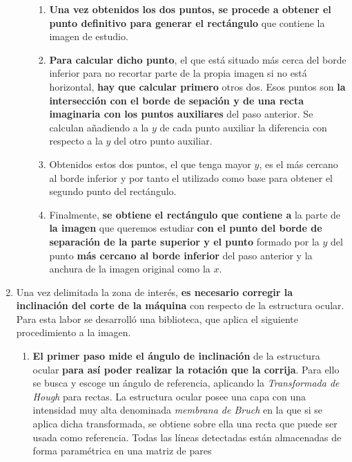 \begin{enumerate}
\begin{enumerate}[label*=\arabic*.]
\begin{enumerate}[label*=\arabic*.]
    \item \textbf{Una vez obtenidos los dos puntos, se procede a
        obtener el punto definitivo para generar el rectángulo} que
      contiene la imagen de estudio.
    \item \textbf{Para calcular dicho punto}, el que está situado más
      cerca del borde inferior para no recortar parte de la propia
      imagen si no está horizontal, \textbf{hay que calcular primero}
      otros dos. Esos puntos son \textbf{la intersección con el borde
        de sepación y de una recta imaginaria con los puntos
        auxiliares} del paso anterior. Se calculan añadiendo a la $y$
      de cada punto auxiliar la diferencia con respecto a la $y$ del
      otro punto auxiliar.
    \item Obtenidos estos dos puntos, el que tenga mayor $y$, es el
      más cercano al borde inferior y por tanto el utilizado como base
      para obtener el segundo punto del rectángulo.
    \item Finalmente, \textbf{se obtiene el rectángulo que contiene a}
      la parte de \textbf{la imagen} que queremos estudiar \textbf{con
        el punto del borde de separación de la parte superior y el
        punto} formado por la $y$ del punto \textbf{más cercano al
        borde inferior} del paso anterior y la anchura de la imagen
      original como la $x$.
    \end{enumerate}
  \end{enumerate}
\item Una vez delimitada la zona de interés, \textbf{es necesario
    corregir la inclinación del corte de la máquina} con respecto de
  la estructura ocular. \\
  Para esta labor se desarrolló una biblioteca, que aplica el
  siguiente procedimiento a la imagen.
  \begin{enumerate}[label*=\arabic*.]
  \item \textbf{El primer paso mide el ángulo de inclinación} de la
    estructura ocular \textbf{para así poder realizar la rotación que
      la corrija}.  Para ello se busca y escoge un ángulo de
    referencia, aplicando la \emph{Transformada de
      Hough} para rectas. La estructura
    ocular posee una capa con una intensidad muy alta denominada
    \emph{membrana de Bruch} en la que si se aplica dicha
    transformada, se obtiene sobre ella una recta que puede ser usada
    como referencia. Todas las líneas detectadas están almacenadas de
    forma paramétrica en una matriz de pares

\end{enumerate}
\end{enumerate}

